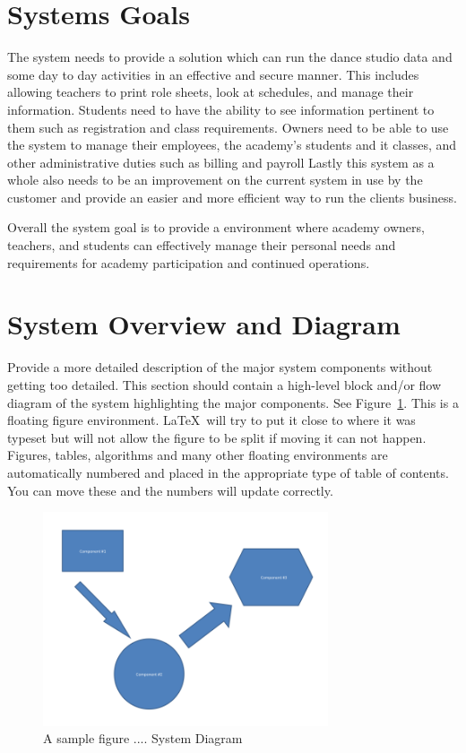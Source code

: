 \section{Systems Goals}
The system needs to provide a solution which can run the dance studio data and some day to day activities in an effective and secure manner. This includes allowing teachers to print role sheets, look at schedules, and manage their information. Students need to have the ability to see information pertinent to them such as registration and class requirements. Owners need to be able to use the system to manage their employees, the academy's students and it classes, and other administrative duties such as billing and payroll  Lastly this system as a whole also needs to be an improvement on the current system in use by the customer and provide an easier and more efficient way to run the clients business.

Overall the system goal is to provide a environment where academy owners, teachers, and students can effectively manage their personal needs and requirements for academy participation and continued operations.


\section{System Overview and Diagram}
Provide a more detailed description of the major system components
without getting too detailed.  This section should contain a
high-level block and/or flow diagram of the system highlighting the
major components.  See Figure~\ref{systemdiagram}.  This is a floating
figure environment.  \LaTeX\ will try to put it close to where it was
typeset but will not allow the figure to be split if moving it can not
happen.  Figures, tables, algorithms and many other floating
environments are automatically numbered and placed in the appropriate
type of table of contents.  You can move these and the numbers will
update correctly.

\begin{figure}[tbh]
\begin{center}
\includegraphics[width=0.75\textwidth]{./diagram}
\end{center}
\caption{A sample figure .... System Diagram \label{systemdiagram}}
\end{figure}

